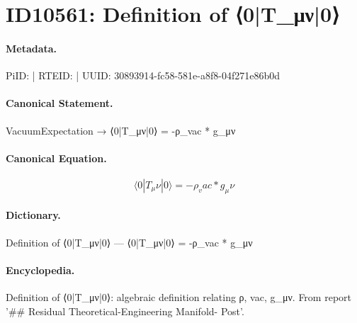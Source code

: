 \section*{ID10561: Definition of ⟨0|T\_μν|0⟩}
\paragraph{Metadata.}
PiID:  | RTEID:  | UUID: 30893914-fc58-581e-a8f8-04f271e86b0d

\paragraph{Canonical Statement.}
VacuumExpectation → ⟨0|T\_μν|0⟩ = -ρ\_vac * g\_μν

\paragraph{Canonical Equation.}
\[
⟨0|T_μν|0⟩ = -ρ_vac * g_μν
\]

\paragraph{Dictionary.}
Definition of ⟨0|T\_μν|0⟩ — ⟨0|T\_μν|0⟩ = -ρ\_vac * g\_μν

\paragraph{Encyclopedia.}
Definition of ⟨0|T\_μν|0⟩: algebraic definition relating ρ, vac, g\_μν. From report '\#\# Residual Theoretical-Engineering Manifold- Post'.
